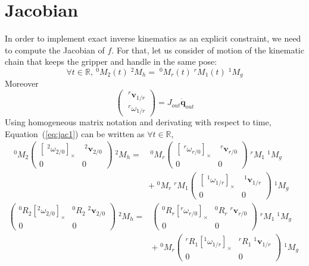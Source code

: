 \documentclass{article}
\newcommand\linvel{\mathbf{v}}
\newcommand\conf{\mathbf{q}}
\newcommand\reals{\mathbb{R}}
\begin{document}
\section{Jacobian}

In order to implement exact inverse kinematics as an explicit constraint, we need to compute the Jacobian of $f$. For that, let us consider of motion of the kinematic chain that keeps the gripper and handle in the same pose:
\begin{equation}\label{eq:jac1}
\forall t\in\reals,\ ^0M_2(t)\;^2M_h = \;^0M_r(t) \;^rM_1(t)\;^1M_g
\end{equation}
Moreover
$$
\left(\begin{array}{c}
  \;^r\linvel_{1/r} \\ \;^r\omega_{1/r}
\end{array}\right) =
J_{out} \dot{\conf}_{out}
$$
Using homogeneous matrix notation and derivating with respect to time, Equation~(\ref{eq:jac1}) can be written as $\forall t\in\reals$,
\begin{align}\label{eq:jac2}
  ^0M_2
  \left(\begin{array}{ll}[\;^2\omega_{2/0}]_{\times} & \;^2\linvel_{2/0} \\ 0&0\end{array}\right)\;^2M_h =&
    \;^0M_r\left(\begin{array}{ll}[\;^r\omega_{r/0}]_{\times} & \;^r\linvel_{r/0} \\ 0&0\end{array}\right) \;^rM_1\;^1M_g \\
    & + \;^0M_r \;^rM_1\left(\begin{array}{ll}[\;^1\omega_{1/r}]_{\times} & \;^1\linvel_{1/r} \\ 0&0\end{array}\right)\;^1M_g &
\end{align}
\begin{align*}
  \left(\begin{array}{ll}^0R_2[^2\omega_{2/0}]_{\times} & ^0R_2\;^2\linvel_{2/0} \\ 0&0\end{array}\right)\;^2M_h =&
    \left(\begin{array}{ll}^0R_r[^r\omega_{r/0}]_{\times} & ^0R_r\;^r\linvel_{r/0} \\ 0&0\end{array}\right) \;^rM_1\;^1M_g \\
    & + \;^0M_r \left(\begin{array}{ll}^rR_1[^1\omega_{1/r}]_{\times} & ^rR_1\;^1\linvel_{1/r} \\ 0&0\end{array}\right)\;^1M_g &
\end{align*}
\end{document}
